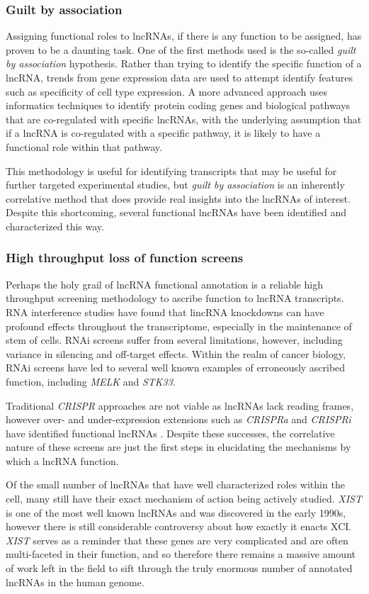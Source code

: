 \subsubsection{Guilt by association}
Assigning functional roles to lncRNAs, if there is any function to be assigned, has proven to be a daunting task. One of the first methods used is the so-called \emph{guilt by association} hypothesis. Rather than trying to identify the specific function of a lncRNA, trends from gene expression data are used to attempt identify features such as specificity of cell type expression. A more advanced approach uses informatics techniques to identify protein coding genes and biological pathways that are co-regulated with specific lncRNAs, with the underlying assumption that if a lncRNA is co-regulated with a specific pathway, it is likely to have a functional role within that pathway. 

This methodology is useful for identifying transcripts that may be useful for further targeted experimental studies, but \emph{guilt by association} is an inherently correlative method that does provide real insights into the lncRNAs of interest. Despite this shortcoming, several functional lncRNAs have been identified and characterized this way. 

\subsubsection{High throughput loss of function screens}
Perhaps the holy grail of lncRNA functional annotation is a reliable high throughput screening methodology to ascribe function to lncRNA transcripts. RNA interference studies have found that lincRNA knockdowns can have profound effects throughout the transcriptome, especially in the maintenance of stem of cells. RNAi screens suffer from several limitations, however, including variance in silencing and off-target effects. Within the realm of cancer biology, RNAi screens have led to several well known examples of erroneously ascribed function, including \emph{MELK} and \emph{STK33}.

Traditional \emph{CRISPR} approaches are not viable as lncRNAs lack reading frames, however over- and under-expression extensions such as \emph{CRISPRa} and \emph{CRISPRi} have identified functional lncRNAs \cite{Cai2020AHomeostasis}. Despite these successes, the correlative nature of these screens are just the first steps in elucidating the mechanisms by which a lncRNA function. 

Of the small number of lncRNAs that have well characterized roles within the cell, many still have their exact mechanism of action being actively studied. \emph{XIST} is one of the most well known lncRNAs and was discovered in the early 1990s, however there is still considerable controversy about how exactly it enacts XCI. \emph{XIST} serves as a reminder that these genes are very complicated and are often multi-faceted in their function, and so therefore there remains a massive amount of work left in the field to sift through the truly enormous number of annotated lncRNAs in the human genome.

